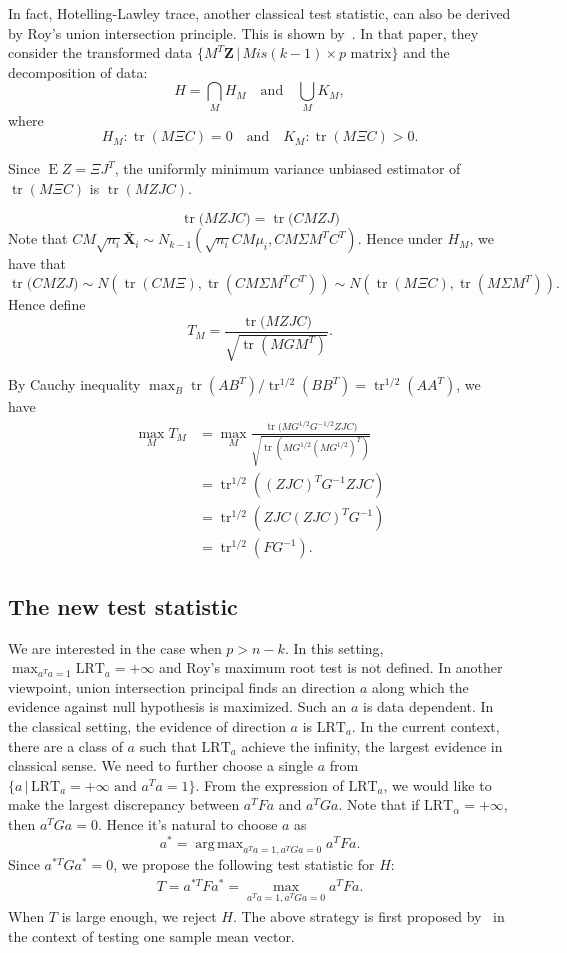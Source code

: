 \documentclass[review]{elsarticle}
\DeclareMathOperator{\mytr}{tr}
\DeclareMathOperator{\myE}{E}
\DeclareMathOperator*{\argmax}{arg\,max}
\newcommand{\bZ}{\mathbf{Z}}
\newcommand{\bX}{\mathbf{X}}
\theoremstyle{plain}
\theoremstyle{definition}
\theoremstyle{remark}
\begin{document}
In fact, Hotelling-Lawley trace, another classical test statistic, can also be derived by Roy's union intersection principle. This is shown by~\cite{Mudholkarl1974}.
 In that paper, they consider the transformed data $\{M^T \bZ\, |\, M is \text{$(k-1)\times p$ matrix}\}$ and the decomposition of data:
 $$H=\bigcap_{M}H_M \quad\text{and}\quad \bigcup_{M}K_M ,$$
 where
 $$
 H_M: \mytr( M \Xi C) = 0\quad \text{and}\quad K_M : \mytr( M \Xi C )> 0.
 $$

Since $\myE Z=\Xi J^T$,
the uniformly minimum variance unbiased estimator of $\mytr(M\Xi C)$ is $\mytr(MZJ C)$.



$$
\mytr \big(MZJC\big)
=
\mytr \big(CMZJ\big)
$$
Note that $CM\sqrt{n_i}\bar{\bX}_i\sim N_{k-1}(\sqrt{n_i}CM\mu_i,CM\Sigma M^T C^T)$.
Hence under $H_M$, we have that
$$
\mytr \big(CMZJ\big)
\sim
N(\mytr(CM\Xi),\mytr(CM\Sigma M^T C^T))
\sim
N(\mytr(M\Xi C),\mytr(M\Sigma M^T )).
$$
Hence define
$$
T_M = \frac{
\mytr \big(MZJC\big)
}{
    \sqrt{\mytr(M G M^T)}
}.
$$


By Cauchy inequality $\max_B \mytr(AB^T)/\mytr^{1/2}(BB^T)=\mytr^{1/2}(AA^T)$, we have
$$
\begin{aligned}
    \max_M T_M &=\max_M \frac{\mytr \big(MG^{1/2}G^{-1/2}ZJC\big)
}{\sqrt{\mytr(M G^{1/2} (M G^{1/2})^T)}
}\\
    &=\mytr^{1/2}((ZJC)^T G^{-1}ZJC)\\
    &=\mytr^{1/2}( ZJC(ZJC)^T G^{-1})\\
    &=\mytr^{1/2}(F G^{-1}).
\end{aligned}
$$

\subsection{The new test statistic}
We are interested in the case when $p> n-k$.
In this setting, $\max_{a^T a=1}\text{LRT}_a=+\infty$ and Roy's maximum root test is not defined. 
In another viewpoint, union intersection principal finds an direction $a$ along which the evidence against null hypothesis is maximized.
Such an $a$ is data dependent.
In the classical setting, the evidence of direction $a$ is $\text{LRT}_a$.
In the current context, there are a class of $a$ such that $\text{LRT}_a$ achieve the infinity, the largest evidence in classical sense.
We need to further choose a single $a$ from $\{a\,|\,\text{LRT}_a=+\infty\text{ and }a^T a =1\}$.
 From the expression of $\text{LRT}_a$, we would like to make the largest discrepancy between $a^T F a$ and $a^T G a$.
Note that if $\text{LRT}_{\alpha}=+\infty$, then $a^T G a=0$.
Hence it's natural to choose $a$ as
$$
        a^{*}=
        \argmax_{a^T a=1, a^T G a=0} 
        a^T F a.
$$
Since $a^{*T}G a^*=0$, we propose the following test statistic for $H$:
\begin{equation*}
    \begin{aligned}
        T=a^{*T} F a^*
        =
        \max_{a^T a=1, a^T G a=0} 
        a^T F a.
    \end{aligned}
\end{equation*}
When $T$ is large enough, we reject $H$.
The above strategy is first proposed by~\cite{Zhao2016A} in the context of testing one sample mean vector.
\end{document}
